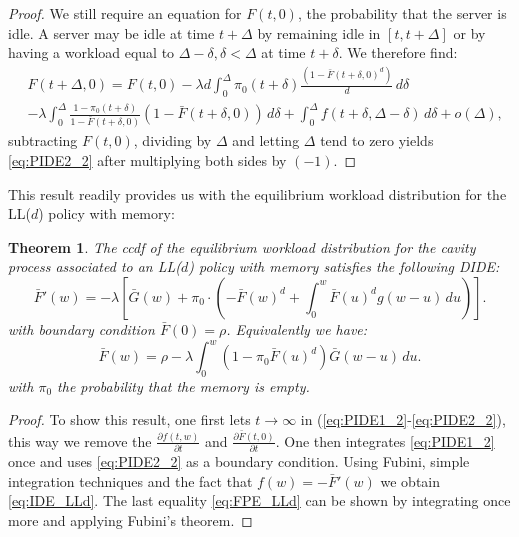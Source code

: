 \documentclass[12pt]{report}
\newtheorem{theorem}{Theorem}
\begin{document}
\begin{proof}
We still require an equation for $F(t,0)$, the probability that the server is idle.
A server may be idle at time $t+\Delta$ by remaining idle in $[t,t+\Delta]$ or by
having a workload equal to $\Delta - \delta, \delta < \Delta$ at time $t + \delta$. 
We therefore find:
\begin{align*}
&F(t+\Delta, 0) = F(t,0) - \lambda d \int_{0}^{\Delta} \pi_0(t+\delta) 
\frac{(1-\bar F(t+\delta,0)^d)}{d}\, d\delta\\
& -\lambda \int_0^\Delta \frac{1-\pi_0(t+\delta)}{1-\bar F(t+\delta,0)} (1-\bar F(t+\delta,0)) \, d\delta + \int_{0}^{\Delta} f(t+\delta, \Delta - \delta)\, d\delta + o(\Delta),
\end{align*}
subtracting $F(t,0)$, dividing by $\Delta$ and letting $\Delta$ tend to zero yields \eqref{eq:PIDE2_2} after multiplying both sides by $(-1)$.
\end{proof}

This result readily provides us with the equilibrium workload distribution for the LL($d$) policy
with memory:
\begin{theorem}
The ccdf of the equilibrium workload distribution for the cavity process associated to an LL($d$)
 policy with memory satisfies the following DIDE:
\begin{equation}
\bar F'(w)=-\lambda \left[ \bar G(w) + \pi_0 \cdot \left( -\bar F(w)^d + \int_0^w \bar F(u)^d g(w-u) \, du \right) \right]. \label{eq:IDE_LLd}
\end{equation}
with boundary condition $\bar F(0)=\rho$. Equivalently we have:
\begin{equation}
\bar F(w)=\rho - \lambda \int_0^w (1-\pi_0 \bar F(u)^d) \bar G(w-u) \, du. \label{eq:FPE_LLd}
\end{equation}
with $\pi_0$ the probability that the memory is empty.
\end{theorem}
\begin{proof}
To show this result, one first lets $t\rightarrow \infty$ in (\ref{eq:PIDE1_2}-\ref{eq:PIDE2_2}), this way we remove the $\frac{\partial f(t,w)}{\partial t}$ and $\frac{\partial \bar F(t,0)}{\partial t}$. One then integrates \eqref{eq:PIDE1_2} once and uses \eqref{eq:PIDE2_2} as a boundary condition. Using Fubini, simple integration techniques and the fact that $f(w)=-\bar F'(w)$ we obtain \eqref{eq:IDE_LLd}. The last equality \eqref{eq:FPE_LLd} can be shown by integrating once more and applying Fubini's theorem.
\end{proof}
\end{document}
